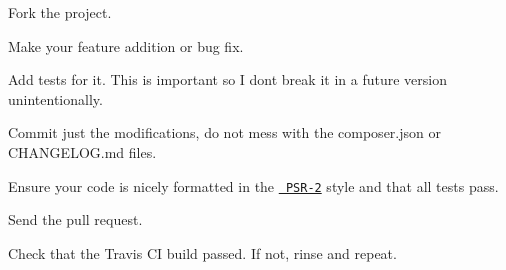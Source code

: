 
\begin{DoxyItemize}
\item Fork the project.
\item Make your feature addition or bug fix.
\item Add tests for it. This is important so I don\textquotesingle{}t break it in a future version unintentionally.
\item Commit just the modifications, do not mess with the composer.\+json or CHANGELOG.\+md files.
\item Ensure your code is nicely formatted in the \href{https://github.com/php-fig/fig-standards/blob/master/accepted/PSR-2-coding-style-guide.md}{\texttt{ PSR-\/2}} style and that all tests pass.
\item Send the pull request.
\item Check that the Travis CI build passed. If not, rinse and repeat. 
\end{DoxyItemize}